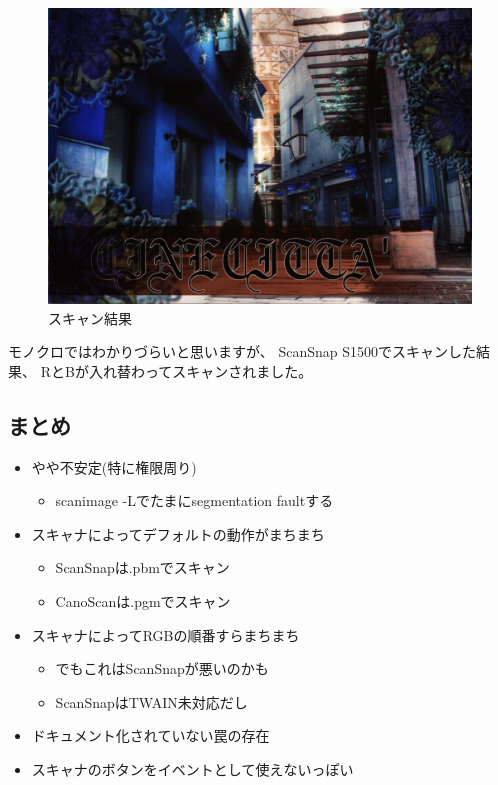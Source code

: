 \documentclass[mingoth,a4paper]{jsarticle}
\begin{document}
\begin{figure}[H]
\begin{center}
 \includegraphics[height=0.5\hsize] {image201012/dst02.jpg}
 \caption{スキャン結果}
\label{fig:scan}
\end{center}
\end{figure}

モノクロではわかりづらいと思いますが、
ScanSnap S1500でスキャンした結果、
RとBが入れ替わってスキャンされました。

\subsection{まとめ}

\begin{itemize}
\item やや不安定(特に権限周り)
  \begin{itemize}
  \item scanimage -Lでたまにsegmentation faultする 
  \end{itemize}
\item スキャナによってデフォルトの動作がまちまち
  \begin{itemize}
  \item ScanSnapは.pbmでスキャン
  \item CanoScanは.pgmでスキャン 
  \end{itemize}
\item スキャナによってRGBの順番すらまちまち
  \begin{itemize}
    \item でもこれはScanSnapが悪いのかも
    \item ScanSnapはTWAIN未対応だし 
  \end{itemize}
\item ドキュメント化されていない罠の存在
\item スキャナのボタンをイベントとして使えないっぽい 
\end{itemize}
\end{document}
